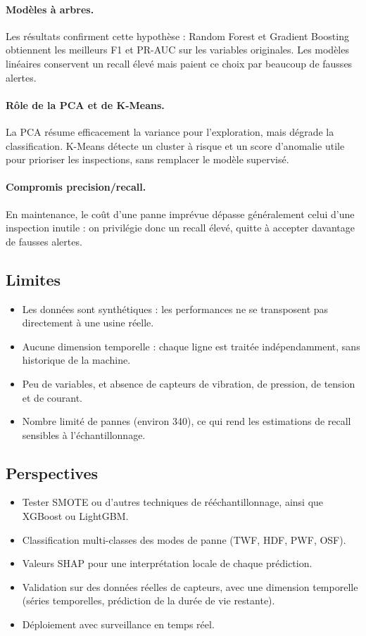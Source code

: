 \documentclass[12pt,a4paper]{article}
\begin{document}
\paragraph{Modèles à arbres.} Les résultats confirment cette hypothèse : Random Forest et Gradient Boosting obtiennent les meilleurs F1 et PR-AUC sur les variables originales. Les modèles linéaires conservent un recall élevé mais paient ce choix par beaucoup de fausses alertes.

\paragraph{Rôle de la PCA et de K-Means.} La PCA résume efficacement la variance pour l'exploration, mais dégrade la classification. K-Means détecte un cluster à risque et un score d'anomalie utile pour prioriser les inspections, sans remplacer le modèle supervisé.

\paragraph{Compromis precision/recall.} En maintenance, le coût d'une panne imprévue dépasse généralement celui d'une inspection inutile : on privilégie donc un recall élevé, quitte à accepter davantage de fausses alertes.

\subsection{Limites}
\begin{itemize}[noitemsep]
  \item Les données sont synthétiques : les performances ne se transposent pas directement à une usine réelle.
  \item Aucune dimension temporelle : chaque ligne est traitée indépendamment, sans historique de la machine.
  \item Peu de variables, et absence de capteurs de vibration, de pression, de tension et de courant.
  \item Nombre limité de pannes (environ 340), ce qui rend les estimations de recall sensibles à l'échantillonnage.
\end{itemize}

\subsection{Perspectives}
\begin{itemize}[noitemsep]
  \item Tester SMOTE ou d'autres techniques de rééchantillonnage, ainsi que XGBoost ou LightGBM.
  \item Classification multi-classes des modes de panne (TWF, HDF, PWF, OSF).
  \item Valeurs SHAP pour une interprétation locale de chaque prédiction.
  \item Validation sur des données réelles de capteurs, avec une dimension temporelle (séries temporelles, prédiction de la durée de vie restante).
  \item Déploiement avec surveillance en temps réel.
\end{itemize}
\end{document}
